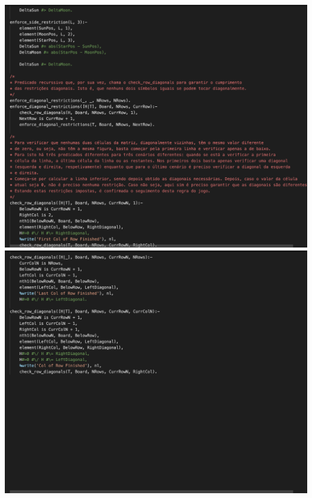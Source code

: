 \documentclass[a4paper]{article}
\begin{document}
\begin{center}
    \includegraphics[scale=0.4]{img/11.png}
    \includegraphics[scale=0.4]{img/12.png}
\end{center}
\end{document}
